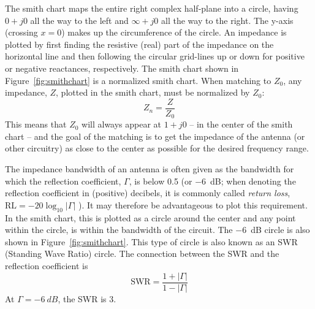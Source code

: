 The smith chart maps the entire right complex half-plane into a circle, having $0+j0$ all the way to the left and $\infty+j0$ all the way to the right. The y-axis (crossing $x=0$) makes up the circumference of the circle. An impedance is plotted by first finding the resistive (real) part of the impedance on the horizontal line and then following the circular grid-lines up or down for positive or negative reactances, respectively. 
The smith chart shown in Figure~\ref{fig:smithchart} is a normalized smith chart. When matching to $Z_0$, any impedance, $Z$, plotted in the smith chart, must be normalized by $Z_0$:
\begin{equation}
    Z_n = \frac{Z}{Z_0}
\end{equation}
This means that $Z_0$ will always appear at $1+j0$ -- in the center of the smith chart -- and the goal of the matching is to get the impedance of the antenna (or other circuitry) as close to the center as possible for the desired frequency range.

The impedance bandwidth of an antenna is often given as the bandwidth for which the reflection coefficient, $\Gamma$, is below 0.5 (or \SI{-6}{dB}; when denoting the reflection coefficient in (positive) decibels, it is commonly called \emph{return loss}, $\text{RL} = -20\log_{10}|\Gamma|$ \cite{pozar2011microwave}). It may therefore be advantageous to plot this requirement. In the smith chart, this is plotted as a circle around the center and any point within the circle, is within the bandwidth of the circuit. The \SI{-6}{dB} circle is also shown in Figure~\ref{fig:smithchart}. This type of circle is also known as an SWR (Standing Wave Ratio) circle. The connection between the SWR and the reflection coefficient is \cite{pozar2011microwave}
\begin{equation}
    \text{SWR} = \frac{1 + |\Gamma|}{1 - |\Gamma|}
\end{equation}
At $\Gamma = \SI{-6}{dB}$, the SWR is 3.

